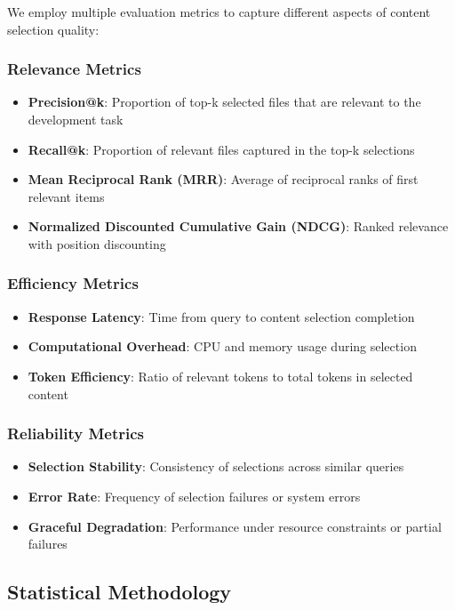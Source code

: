 \documentclass[conference]{IEEEtran}
\begin{document}
We employ multiple evaluation metrics to capture different aspects of content selection quality:

\subsubsection{Relevance Metrics}
\begin{itemize}
\item \textbf{Precision@k}: Proportion of top-k selected files that are relevant to the development task
\item \textbf{Recall@k}: Proportion of relevant files captured in the top-k selections
\item \textbf{Mean Reciprocal Rank (MRR)}: Average of reciprocal ranks of first relevant items
\item \textbf{Normalized Discounted Cumulative Gain (NDCG)}: Ranked relevance with position discounting
\end{itemize}

\subsubsection{Efficiency Metrics}
\begin{itemize}
\item \textbf{Response Latency}: Time from query to content selection completion
\item \textbf{Computational Overhead}: CPU and memory usage during selection
\item \textbf{Token Efficiency}: Ratio of relevant tokens to total tokens in selected content
\end{itemize}

\subsubsection{Reliability Metrics}
\begin{itemize}
\item \textbf{Selection Stability}: Consistency of selections across similar queries
\item \textbf{Error Rate}: Frequency of selection failures or system errors
\item \textbf{Graceful Degradation}: Performance under resource constraints or partial failures
\end{itemize}

\subsection{Statistical Methodology}
\end{document}
